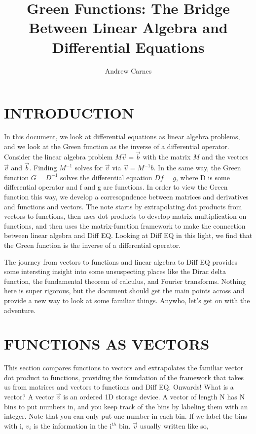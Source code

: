 \documentclass[12pt]{article}
\begin{document}
\title{Green Functions: The Bridge Between Linear Algebra and Differential Equations}
\author{Andrew Carnes}

\maketitle

\newpage
\tableofcontents
\newpage

\section{INTRODUCTION} \label{intro}

In this document, we look at differential equations as linear algebra problems, and we look at the Green function as the inverse of a differential operator. Consider the linear algebra problem $M\vec{v}=\vec{b}$ with the matrix $M$ and the vectors $\vec{v}$ and $\vec{b}$. Finding $M^{-1}$ solves for $\vec{v}$ via $\vec{v}=M^{-1}b$. In the same way, the Green function $G=D^{-1}$ solves the differential equation $Df=g$, where D is some differential operator and f and g are functions. In order to view the Green function this way, we develop a corresopndence between matrices and derivatives and functions and vectors. The note starts by extrapolating dot products from vectors to functions, then uses dot products to develop matrix multiplication on functions, and then uses the matrix-function framework to make the connection between linear algebra and Diff EQ. Looking at Diff EQ in this light, we find that the Green function is the inverse of a differential operator. 

The journey from vectors to functions and linear algebra to Diff EQ provides some intersting insight into some unsuspecting places like the Dirac delta function, the fundamental theorem of calculus, and Fourier transforms. Nothing here is super rigorous, but the document should get the main points across and provide a new way to look at some familiar things. Anywho, let's get on with the adventure.

\section{FUNCTIONS AS VECTORS}  

This section compares functions to vectors and extrapolates the familiar vector dot product to functions, providing the foundation of the framework that takes us from matrices and vectors to functions and Diff EQ. Onwards! What is a vector? A vector $\vec{v}$ is an ordered 1D storage device. A vector of length N has N bins to put numbers in, and you keep track of the bins by labeling them with an integer. Note that you can only put one number in each bin. If we label the bins with i, $v_i$ is the information in the i$^{th}$ bin. $\vec{v}$ usually written like so, 
\end{document}

